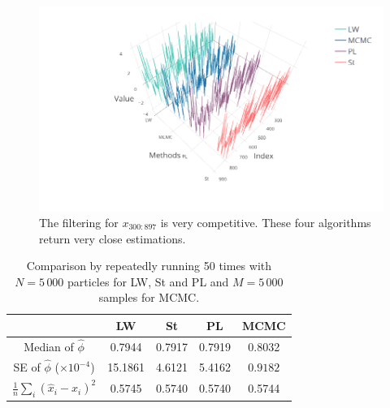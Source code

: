 \begin{figure}[h]
\centering
\includegraphics[width=\textwidth]{Chapters/04Filtering/plot/plotlyFilterCompX2.png}
\caption{The filtering for $x_{300:897}$ is very competitive. These four algorithms return very close estimations. } \label{FilterRiewComparesion02}
\end{figure}

\begin{table}[]
\centering
\caption{Comparison by repeatedly running 50 times with $N=5\,000$ particles for LW, St and PL and $M=5\,000$ samples for MCMC. }
\label{FilterRiewComparesionTable}
\begin{tabular}{|c|c|c|c|c|}
\hline
     & LW & St & PL  & MCMC\\ \hline
Median of $\hat{\phi}$ &  0.7944  &  0.7917   &  0.7919 & 0.8032 \\ \hline
SE of $\hat{\phi}$ ($\times 10^{-4}$) &  15.1861  &  4.6121 & 5.4162 &  $\mathbf{0.9182}$  \\ \hline
$\frac{1}{n}\sum_i(\hat{x}_i-x_i)^2$ &  0.5745 &  0.5740 &  0.5740 & 0.5744  \\ \hline
\end{tabular}
\end{table}


